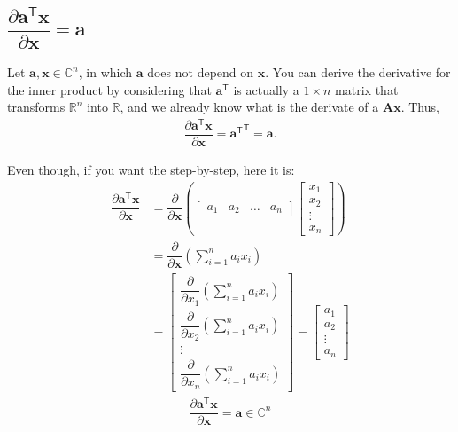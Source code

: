 \documentclass{article}
\newcommand{\trans}{\mathsf{T}}
\begin{document}
\subsection{\(\dfrac{\partial \mathbf{a}^\trans \mathbf{x}}{\partial \mathbf{x}} = \mathbf{a}\)}

Let \(\mathbf{a, x} \in \mathbb{C}^{n}\), in which \(\mathbf{a}\) does not depend on \(\mathbf{x}\). You can derive the derivative for the inner product by considering that \(\mathbf{a}^\trans\) is actually a \(1\times n\) matrix that transforms \(\mathbb{R}^{n}\) into \(\mathbb{R}\), and we already know what is the derivate of a \(\mathbf{Ax}\). Thus,
\begin{align}
    \dfrac{\partial \mathbf{a}^\trans \mathbf{x}}{\partial \mathbf{x}} = {\mathbf{a}^\trans}^\trans = \mathbf{a}.
\end{align}

Even though, if you want the step-by-step, here it is:
\begin{align}
    \dfrac{\partial \mathbf{a}^\trans \mathbf{x}}{\partial \mathbf{x}} &= \dfrac{\partial}{\partial \mathbf{x}} \left(
    \begin{bmatrix}
        a_1 & a_2 & \dots & a_n
    \end{bmatrix} \begin{bmatrix}
        x_{1} \\ x_{2} \\ \vdots \\ x_{n}
    \end{bmatrix} \right) \\
    & = \dfrac{\partial}{\partial \mathbf{x}} \left( \sum_{i = 1}^n a_ix_i \right) \\
    & = \begin{bmatrix}
        \dfrac{\partial}{\partial x_1} \left( \sum_{i = 1}^n a_ix_i \right) \\ \dfrac{\partial}{\partial x_2} \left( \sum_{i = 1}^n a_ix_i \right) \\ \vdots \\ \dfrac{\partial}{\partial x_n} \left( \sum_{i = 1}^n a_ix_i \right) 
    \end{bmatrix} = \begin{bmatrix}
        a_1 \\ a_2 \\ \vdots \\ a_n
    \end{bmatrix}
\end{align}
\begin{align}
    \boxed{\dfrac{\partial \mathbf{a}^\trans \mathbf{x}}{\partial \mathbf{x}} = \mathbf{a} \in \mathbb{C}^{n}}
\end{align}
\end{document}
